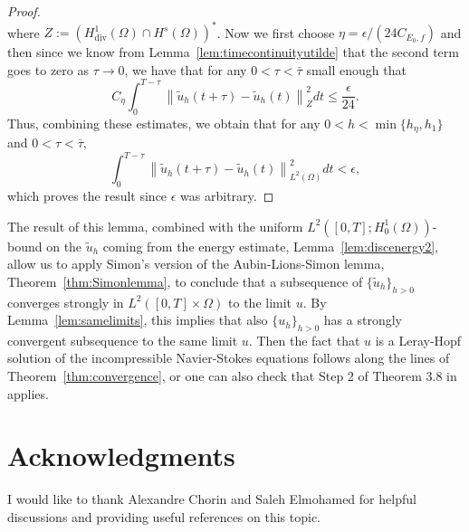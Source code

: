 \documentclass[10pt,letterpaper]{amsart}
\newcommand{\tu}{\widetilde{u}}
\newcommand\norm[1]{\left\lVert#1\right\rVert}
\newcommand{\Div}{\operatorname{div}}
\newcommand{\dom}{\Omega}
\theoremstyle{definition}{\newtheorem{definition}[lemma]{Definition}}
\numberwithin{equation}{section}
\begin{document}
\begin{proof}
\begin{equation*}
	\end{equation*}
	where $Z:= (H^1_{\Div}(\dom)\cap H^s(\dom))^*$. Now we first choose $\eta = \epsilon / (24C_{E_0,f})$ and then since we know from Lemma~\ref{lem:timecontinuityutilde} that the second term goes to zero as $\tau\to 0$, we have that for any $0<\tau<\bar{\tau}$ small enough that
	\begin{equation*}
		C_\eta\int_0^{T-\tau}\norm{\tu_h(t+\tau)-\tu_h(t )}_Z^2 dt \leq \frac{\epsilon}{24}.
	\end{equation*}
	Thus, combining these estimates, we obtain that for any
	 $0<h<\min\{h_\eta,h_1\}$ and $0<\tau< \bar{\tau}$, 
	\begin{equation*}
			\int_0^{T-\tau}\norm{\tu_h(t+\tau)-\tu_h(t)}_{L^2(\dom)}^2 dt<\epsilon,
	\end{equation*}
	 which proves the result since $\epsilon$ was arbitrary.
\end{proof}
The result of this lemma, combined with the uniform $L^2([0,T];H^1_0(\dom))$-bound on the $\tu_h$ coming from the energy estimate, Lemma~\ref{lem:discenergy2}, allow us to apply Simon's version of the Aubin-Lions-Simon lemma, Theorem~\ref{thm:Simonlemma}, to conclude that a subsequence of $\{\tu_h\}_{h>0}$ converges strongly in $L^2([0,T]\times\dom)$ to the limit $u$. By Lemma~\ref{lem:samelimits}, this implies that also $\{{u}_h\}_{h>0}$ has a strongly convergent subsequence to the same limit $u$. Then the fact that $u$ is a Leray-Hopf solution of the incompressible Navier-Stokes equations follows along the lines of Theorem~\ref{thm:convergence}, or one can also check that Step 2 of Theorem 3.8 in~\cite{Eymard2024} applies.

\section*{Acknowledgments}
I would like to thank Alexandre Chorin and Saleh Elmohamed for helpful discussions and providing useful references on this topic.

\appendix
\end{document}
